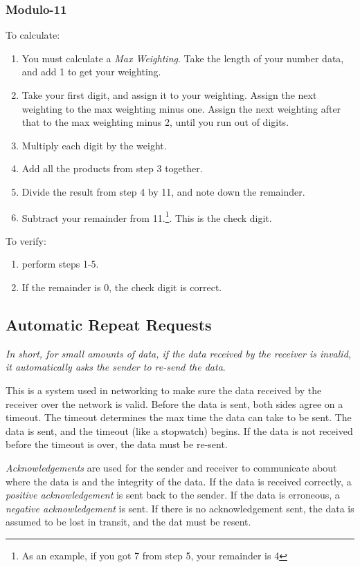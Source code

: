 \documentclass[../main.tex]{subfiles}
\begin{document}
\subsubsection{Modulo-11}

To calculate:

\begin{enumerate}
    \item You must calculate a \emph{Max Weighting}. Take the length of your number data, and add 1 to get your weighting.
    \item Take your first digit, and assign it to your weighting. Assign the next weighting to the max weighting minus one. Assign the next weighting after that to the max weighting minus 2, until you run out of digits.
    \item Multiply each digit by the weight.
    \item Add all the products from step 3 together.
    \item Divide the result from step 4 by 11, and note down the remainder.
    \item Subtract your remainder from 11.\footnote{As an example, if you got 7 from step 5, your remainder is 4}. This is the check digit.
\end{enumerate}

To verify:

\begin{enumerate}
    \item perform steps 1-5.
    \item If the remainder is 0, the check digit is correct.
\end{enumerate}

\subsection{Automatic Repeat Requests}

\emph{In short, for small amounts of data, if the data received by the receiver is invalid, it automatically asks the sender to re-send the data}.

This is a system used in networking to make sure the data received by the receiver over the network is valid. Before the data is sent, both sides agree on a timeout. The timeout determines the max time the data can take to be sent. The data is sent, and the timeout (like a stopwatch) begins. If the data is not received before the timeout is over, the data must be re-sent.

\emph{Acknowledgements} are used for the sender and receiver to communicate about where the data is and the integrity of the data. If the data is received correctly, a \emph{positive acknowledgement} is sent back to the sender. If the data is erroneous, a \emph{negative acknowledgement} is sent. If there is no acknowledgement sent, the data is assumed to be lost in transit, and the dat must be resent.
\end{document}
